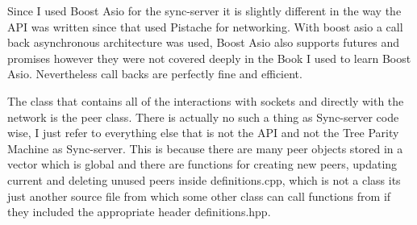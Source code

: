 Since I used Boost Asio for the sync-server it is slightly different in the way the API was written since that used Pistache for networking. With boost asio a call back asynchronous architecture was used, Boost Asio also supports futures and promises however they were not covered deeply in the Book I used to learn Boost Asio. Nevertheless call backs are perfectly fine and efficient. 

The class that contains all of the interactions with sockets and directly with the network is the peer class. There is actually no such a thing as Sync-server code wise, I just refer to everything else that is not the API and not the Tree Parity Machine as Sync-server. This is because there are many peer objects stored in a vector which is global and there are functions for creating new peers, updating current and deleting unused peers inside definitions.cpp, which is not a class its just another source file from which some other class can call functions from if they included the appropriate header definitions.hpp.

